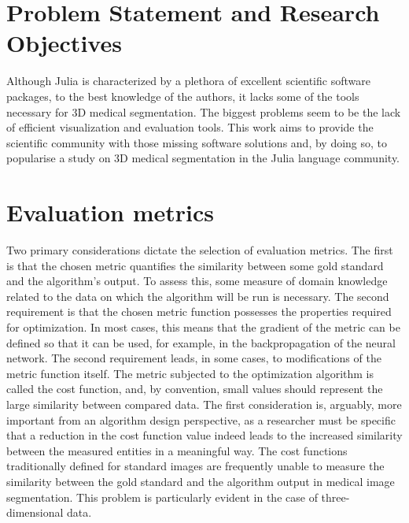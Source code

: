 \documentclass{juliacon}
\begin{document}
\section{Problem Statement and Research Objectives}
Although Julia is characterized by a plethora of excellent scientific software packages, to the best knowledge of the authors, it lacks some of the tools necessary for 3D medical segmentation. The biggest problems seem to be the lack of efficient visualization and evaluation tools. This work aims to provide the scientific community with those missing software solutions and, by doing so, to popularise a study on 3D medical segmentation in the Julia language community.


\section{Evaluation metrics}

Two primary considerations dictate the selection of evaluation metrics. The first is that the chosen metric quantifies the similarity between some gold standard and the algorithm's output. To assess this, some measure of domain knowledge related to the data on which the algorithm will be run is necessary. The second requirement is that the chosen metric function possesses  the properties required for optimization. In most cases, this means that the gradient of the metric can be defined so that it can be used, for example, in the backpropagation of the neural network. The second requirement leads, in some cases, to modifications of the metric function itself. The metric subjected to the optimization algorithm is called the cost function, and, by convention, small values should represent the large similarity between compared data. The first consideration is, arguably, more important from an algorithm design perspective, as a researcher must be specific that a reduction in the cost function value indeed leads to the increased similarity between the measured entities in a meaningful way. The cost functions traditionally defined for standard images are frequently unable to measure the similarity between the gold standard and the algorithm output in medical image segmentation. This problem is particularly evident in the case of three-dimensional data.
\end{document}
